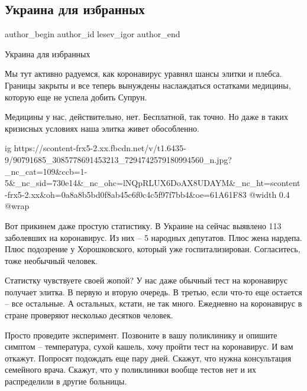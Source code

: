  
 
 
 
 
 
\subsection{Украина для избранных}
\label{sec:25_03_2020.fb.lesev_igor.1.medicina_ukraina_dlja_izbrannyh}
 
\ifcmt
 author_begin
   author_id lesev_igor
 author_end
\fi

Украина для избранных

Мы тут активно радуемся, как коронавирус уравнял шансы элитки и плебса. Границы
закрыты и все теперь вынуждены наслаждаться остатками медицины, которую еще не
успела добить Супрун.

Медицины у нас, действительно, нет. Бесплатной, так точно. Но даже в таких
кризисных условиях наша элитка живет обособленно.

\ifcmt
  ig https://scontent-frx5-2.xx.fbcdn.net/v/t1.6435-9/90791685_3085778691453213_7294742579180994560_n.jpg?_nc_cat=109&ccb=1-5&_nc_sid=730e14&_nc_ohc=lNQpRLUX6DoAX8UDAYM&_nc_ht=scontent-frx5-2.xx&oh=0a8a8b5bd0f8ab45c6f0c4c5f97f7bb4&oe=61A61F83
  @width 0.4
  @wrap 
\fi

Вот прикинем даже простую статистику. В Украине на сейчас выявлено 113
заболевших на коронавирус. Из них – 5 народных депутатов. Плюс жена нардепа.
Плюс подозрение у Хорошковского, который уже госпитализирован. Согласитесь,
тоже необычный человек.

Статистку чувствуете своей жопой? У нас даже обычный тест на коронавирус
получает элитка. В первую и вторую очередь. В третью, если что-то еще остается
– все остальные. А остальных, кстати, не так много. Ежедневно на коронавирус в
стране проверяют несколько десятков человек.

Просто проведите эксперимент. Позвоните в вашу поликлинику и опишите симптом –
температура, сухой кашель, хочу пройти тест на коронавирус. И вам откажут.
Попросят подождать еще пару дней. Скажут, что нужна консультация семейного
врача. Скажут, что у поликлиники вообще тестов нет и их распределили в другие
больницы.

